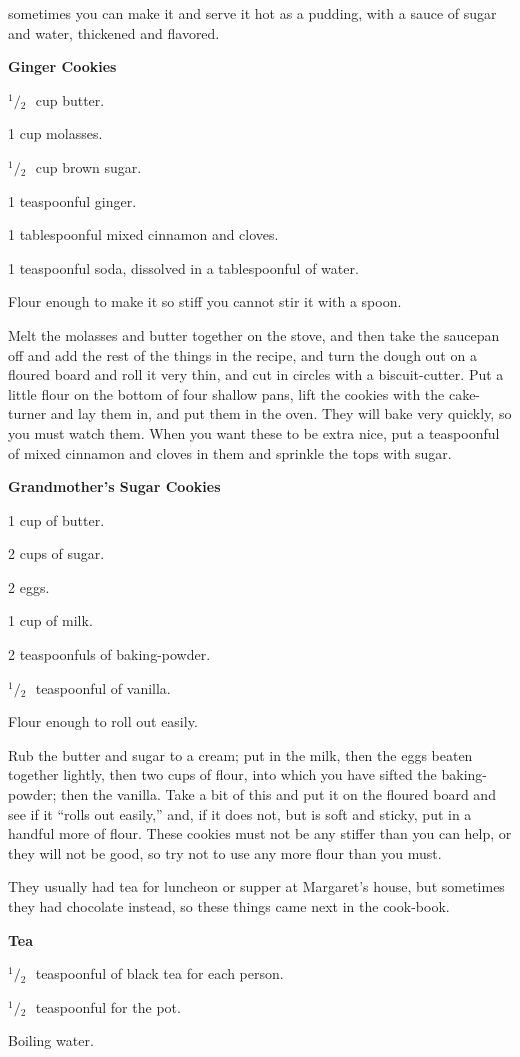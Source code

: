 \documentclass[11pt]{book}
\newcommand{\indpar}{\par\noindent\hspace*{\parindent}}
\newcommand{\ingredient}{\indpar}
\newcommand{\instruction}{\indpar}
\newcommand{\OneHalf}{\ensuremath{{}^1\!\!/\!{}_2\mbox{\ }}}
\newenvironment{RecipeTitle}{\medskip\begin{center}\large\bf }{\end{center}\smallskip}
\begin{document}
sometimes you can make it and serve it hot as a pudding,
with a sauce of sugar and water, thickened and flavored.\pagebreak[4]
\begin{RecipeTitle}
Ginger Cookies\label{ginger_cookies}
\end{RecipeTitle}
\ingredient  \OneHalf cup butter.
\ingredient  1 cup molasses.
\ingredient  \OneHalf cup brown sugar.
\ingredient  1 teaspoonful ginger.
\ingredient  1 tablespoonful mixed cinnamon and cloves.
\ingredient  1 teaspoonful soda, dissolved in a tablespoonful of water.
\ingredient  Flour enough to make it so stiff you cannot stir it with
a spoon.
\instruction
  Melt the molasses and butter together on the stove, and
then take the saucepan off and add the rest of the things
in the recipe, and turn the dough out on a floured board
and roll it very thin, and cut in circles with a biscuit-cutter.
Put a little flour on the bottom of four shallow pans, lift
the cookies with the cake-turner and lay them in, and put
them in the oven.  They will bake very quickly, so you
must watch them.  When you want these to be extra nice,
put a teaspoonful of mixed cinnamon and cloves in them
and sprinkle the tops with sugar.\pagebreak[4]
\begin{RecipeTitle}
Grandmother's Sugar Cookies\label{grandmothers_sugar_cookies}
\end{RecipeTitle}
\ingredient  1 cup of butter.
\ingredient  2 cups of sugar.
\ingredient  2 eggs.
\ingredient  1 cup of milk.
\ingredient  2 teaspoonfuls of baking-powder.
\ingredient  \OneHalf teaspoonful of vanilla.
\ingredient  Flour enough to roll out easily.
\instruction
  Rub the butter and sugar to a cream; put in the milk,
then the eggs beaten together lightly, then two cups of
flour, into which you have sifted the baking-powder;$\!$
then the vanilla.  Take a bit of this and put it on the
floured board and see if it ``rolls out easily,'' and,
if it does not, but is soft and sticky, put in a handful
more of flour.  These cookies must not be any stiffer
than you can help, or they will not be good, so try not
to use any more flour than you must.
\bigskip
\indpar
  They usually had tea for luncheon or supper at
Margaret's house, but sometimes they had chocolate
instead, so these things came next in the cook-book.\pagebreak[4]
\begin{RecipeTitle}
Tea\label{tea}
\end{RecipeTitle}
\ingredient  \OneHalf teaspoonful of black tea for each person.
\ingredient  \OneHalf teaspoonful for the pot.
\ingredient  Boiling water.
\instruction
\end{document}

